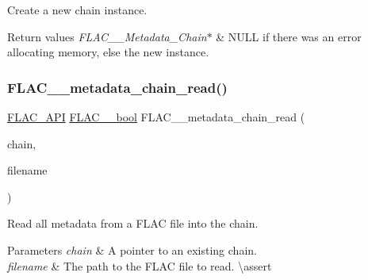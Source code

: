 Create a new chain instance.


\begin{DoxyRetVals}{Return values}
{\em F\+L\+A\+C\+\_\+\+\_\+\+Metadata\+\_\+\+Chain$\ast$} & {\ttfamily N\+U\+LL} if there was an error allocating memory, else the new instance. \\
\hline
\end{DoxyRetVals}
\mbox{\label{group__flac__metadata__level2_gadb7d8e9a82aeb43e256f0a948adf5c45}} 
\subsubsection{\texorpdfstring{FLAC\_\_metadata\_chain\_read()}{FLAC\_\_metadata\_chain\_read()}}
{\footnotesize\ttfamily \mbox{\hyperlink{group__flac__export_ga56ca07df8a23310707732b1c0007d6f5}{F\+L\+A\+C\+\_\+\+A\+PI}} \mbox{\hyperlink{ordinals_8h_a95103469f1cbd78b8cf250194985b34e}{F\+L\+A\+C\+\_\+\+\_\+bool}} F\+L\+A\+C\+\_\+\+\_\+metadata\+\_\+chain\+\_\+read (\begin{DoxyParamCaption}\item[{\mbox{\hyperlink{group__flac__metadata__level2_gaec6993c60b88f222a52af86f8f47bfdf}{F\+L\+A\+C\+\_\+\+\_\+\+Metadata\+\_\+\+Chain}} $\ast$}]{chain,  }\item[{const char $\ast$}]{filename }\end{DoxyParamCaption})}

Read all metadata from a F\+L\+AC file into the chain.


\begin{DoxyParams}{Parameters}
{\em chain} & A pointer to an existing chain. \\
\hline
{\em filename} & The path to the F\+L\+AC file to read. \textbackslash{}assert 
\begin{DoxyCode}{1}
\end{DoxyCode}
 
\begin{DoxyCode}{1}
\end{DoxyCode}
 \\
\hline
\end{DoxyParams}

